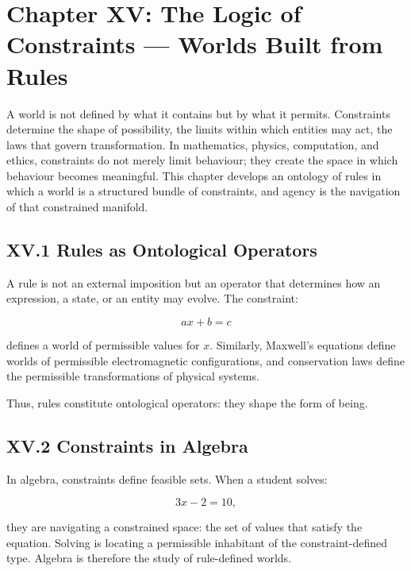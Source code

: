 \documentclass[12pt,letterpaper]{article}
\begin{document}
\newpage
\section{Chapter XV: The Logic of Constraints — Worlds Built from Rules}

A world is not defined by what it contains but by what it permits. Constraints determine the shape of possibility, the limits within which entities may act, the laws that govern transformation. In mathematics, physics, computation, and ethics, constraints do not merely limit behaviour; they create the space in which behaviour becomes meaningful. This chapter develops an ontology of rules in which a world is a structured bundle of constraints, and agency is the navigation of that constrained manifold.

\subsection{XV.1 Rules as Ontological Operators}

A rule is not an external imposition but an operator that determines how an expression, a state, or an entity may evolve. The constraint:

\[
ax + b = c
\]

defines a world of permissible values for \(x\). Similarly, Maxwell’s equations define worlds of permissible electromagnetic configurations, and conservation laws define the permissible transformations of physical systems.

Thus, rules constitute ontological operators: they shape the form of being.

\subsection{XV.2 Constraints in Algebra}

In algebra, constraints define feasible sets. When a student solves:

\[
3x - 2 = 10,
\]

they are navigating a constrained space: the set of values that satisfy the equation. Solving is locating a permissible inhabitant of the constraint-defined type. Algebra is therefore the study of rule-defined worlds.
\end{document}
